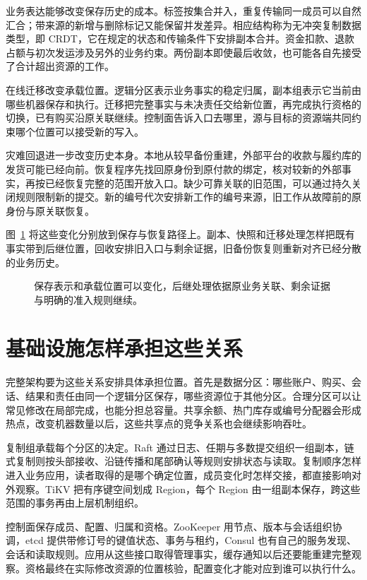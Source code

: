 业务表达能够改变保存历史的成本。标签按集合并入，重复传输同一成员可以自然汇合；带来源的新增与删除标记又能保留并发差异。相应结构称为无冲突复制数据类型，即 CRDT，它在规定的状态和传输条件下安排副本合并。资金扣款、退款占额与初次发运涉及另外的业务约束。两份副本即使最后收敛，也可能各自先接受了合计超出资源的工作。

在线迁移改变承载位置。逻辑分区表示业务事实的稳定归属，副本组表示它当前由哪些机器保存和执行。迁移把完整事实与未决责任交给新位置，再完成执行资格的切换，已有购买沿原关联继续。控制面告诉入口去哪里，源与目标的资源端共同约束哪个位置可以接受新的写入。

灾难回退进一步改变历史本身。本地从较早备份重建，外部平台的收款与履约库的发货可能已经向前。恢复程序先找回原身份到原付款的绑定，核对较新的外部事实，再按已经恢复完整的范围开放入口。缺少可靠关联的旧范围，可以通过持久关闭规则限制新的提交。新的编号代次安排新工作的编号来源，旧工作从故障前的原身份与原关联恢复。

图~\ref{fig:overview-history} 将这些变化分别放到保存与恢复路径上。副本、快照和迁移处理怎样把既有事实带到后继位置，回收安排旧入口与剩余证据，旧备份恢复则重新对齐已经分散的业务历史。

\begin{figure}[htbp]
\centering

\caption{保存表示和承载位置可以变化，后继处理依据原业务关联、剩余证据与明确的准入规则继续。}
\label{fig:overview-history}
\end{figure}

\section*{基础设施怎样承担这些关系}

完整架构要为这些关系安排具体承担位置。首先是数据分区：哪些账户、购买、会话、结果和责任由同一个逻辑分区保存，哪些资源位于其他分区。合理分区可以让常见修改在局部完成，也能分担总容量。共享余额、热门库存或编号分配器会形成热点，改变机器数量以后，这些共享点的竞争关系也会继续影响吞吐。

复制组承载每个分区的决定。Raft 通过日志、任期与多数提交组织一组副本，链式复制则按头部接收、沿链传播和尾部确认等规则安排状态与读取。复制顺序怎样进入业务应用，读者取得的是哪个确定位置，成员变化时怎样交接，都直接影响对外观察。TiKV 把有序键空间划成 Region，每个 Region 由一组副本保存，跨这些范围的事务再由上层机制组织。

控制面保存成员、配置、归属和资格。ZooKeeper 用节点、版本与会话组织协调，etcd 提供带修订号的键值状态、事务与租约，Consul 也有自己的服务发现、会话和读取规则。应用从这些接口取得管理事实，缓存通知以后还要能重建完整观察。资格最终在实际修改资源的位置核验，配置变化才能对应到谁可以执行什么。

